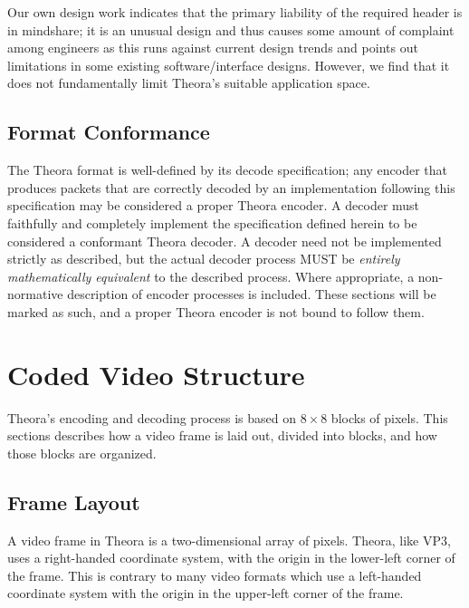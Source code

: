 \documentclass[11pt,letterpaper]{book}
\numberwithin{equation}{chapter}
\numberwithin{figure}{chapter}
\numberwithin{table}{chapter}
\begin{document}
Our own design work indicates that the primary liability of the required header
 is in mindshare; it is an unusual design and thus causes some amount of
 complaint among engineers as this runs against current design trends and
 points out limitations in some existing software/interface designs.
However, we find that it does not fundamentally limit Theora's suitable
 application space.

\section{Format Conformance}

The Theora format is well-defined by its decode specification; any encoder that
 produces packets that are correctly decoded by an implementation following
 this specification may be considered a proper Theora encoder.
A decoder must faithfully and completely implement the specification defined
 herein %
 to be considered a conformant Theora decoder.
A decoder need not be implemented strictly as described, but the
 actual decoder process MUST be {\em entirely mathematically equivalent}
 to the described process.
Where appropriate, a non-normative description of encoder processes is
 included.
These sections will be marked as such, and a proper Theora encoder is not
 bound to follow them.



\chapter{Coded Video Structure}

Theora's encoding and decoding process is based on $8\times 8$ blocks of
 pixels.
This sections describes how a video frame is laid out, divided into
 blocks, and how those blocks are organized.

\section{Frame Layout}

A video frame in Theora is a two-dimensional array of pixels.
Theora, like VP3, uses a right-handed coordinate system, with the origin in the
 lower-left corner of the frame.
This is contrary to many video formats which use a left-handed coordinate
 system with the origin in the upper-left corner of the frame.
\end{document}
